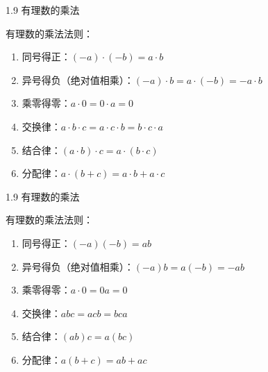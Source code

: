 \documentclass[aspectratio=169]{ctexbeamer} %
\date{\today}
\begin{document}
\begin{frame}[t]{1.9 有理数的乘法}
\begin{spacing}{1.2}
\normalsize
有理数的乘法法则：
\begin{enumerate}[label={\arabic*.}]
\item 同号得正：$(-a) \cdot (-b)  = a  \cdot b$
\item 异号得负（绝对值相乘）：$(-a) \cdot b  = a  \cdot (-b) = -a \cdot b$
\item 乘零得零：$ a \cdot 0  =  0 \cdot a = 0$
\item 交换律：$a \cdot b \cdot c = a  \cdot c \cdot b = b  \cdot c \cdot a$
\item 结合律：$(a \cdot b) \cdot c = a \cdot (b \cdot c)$
\item 分配律：$a \cdot (b + c) = a \cdot b + a \cdot c$
\end{enumerate}

\end{spacing}
\end{frame}

\begin{frame}[t]{1.9 有理数的乘法}
\begin{spacing}{1.2}
\normalsize
有理数的乘法法则：
\begin{enumerate}[label={\arabic*.}]
\item 同号得正：$(-a)(-b)  = ab$
\item 异号得负（绝对值相乘）：$(-a)b  = a(-b) = -ab$
\item 乘零得零：$ a \cdot 0  =  0a = 0$
\item 交换律：$abc = acb = bca$
\item 结合律：$(ab)c = a(bc)$
\item 分配律：$a(b + c) = ab + ac$
\end{enumerate}

\end{spacing}
\end{frame}
\end{document}
